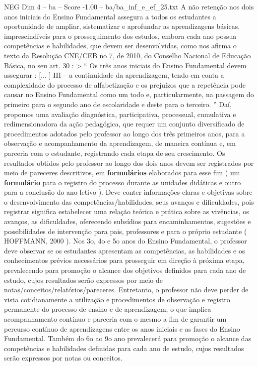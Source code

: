 \begin{textsample}{NEG Dim 4 – ba – Score -1.00 – ba/ba\_inf\_e\_ef\_25.txt}
A não retenção nos dois anos iniciais do Ensino Fundamental assegura a todos os estudantes a oportunidade de ampliar, sistematizar e aprofundar as aprendizagens básicas, imprescindíveis para o prosseguimento dos estudos, embora cada ano possua competências e habilidades, que devem ser desenvolvidas, como nos afirma o texto da Resolução CNE/CEB no 7, de 2010, do Conselho Nacional de Educação Básica, no seu art. 30 : > “ Os três anos iniciais do Ensino Fundamental devem assegurar : [... ] III – a continuidade da aprendizagem, tendo em conta a complexidade do processo de alfabetização e os prejuízos que a repetência pode causar no Ensino Fundamental como um todo e, particularmente, na passagem do primeiro para o segundo ano de escolaridade e deste para o terceiro. ” Daí, propomos uma avaliação diagnóstica, participativa, processual, cumulativa e redimensionadora da ação pedagógica, que requer um conjunto diversificado de procedimentos adotados pelo professor ao longo dos três primeiros anos, para a observação e acompanhamento da aprendizagem, de maneira contínua e, em parceria com o estudante, registrando cada etapa de seu crescimento.
Os resultados obtidos pelo professor ao longo dos dois anos devem ser registrados por meio de pareceres descritivos, em \textbf{formulários} elaborados para esse fim ( um \textbf{formulário} para o registro do processo durante as unidades didáticas e outro para a conclusão do ano letivo ).
Deve conter informações claras e objetivas sobre o desenvolvimento das competências/habilidades, seus avanços e dificuldades, pois registrar significa estabelecer uma relação teórica e prática sobre as vivências, os avanços, as dificuldades, oferecendo subsídios para encaminhamentos, sugestões e possibilidades de intervenção para pais, professores e para o próprio estudante ( HOFFMANN, 2000 ).
Nos 3o, 4o e 5o anos do Ensino Fundamental, o professor deve observar se os estudantes apresentam as competências, as habilidades e os conhecimentos prévios necessários para prosseguir em direção à próxima etapa, prevalecendo para promoção o alcance dos objetivos definidos para cada ano de estudo, cujos resultados serão expressos por meio de notas/conceitos/relatórios/pareceres.
Entretanto, o professor não deve perder de vista cotidianamente a utilização e procedimentos de observação e registro permanente do processo de ensino e de aprendizagem, o que implica acompanhamento contínuo e parceria com o mesmo a fim de garantir um percurso contínuo de aprendizagens entre os anos iniciais e as fases do Ensino Fundamental.
Também do 6o ao 9o ano prevalecerá para promoção o alcance das competências e habilidades definidas para cada ano de estudo, cujos resultados serão expressos por notas ou conceitos.

\end{textsample}

